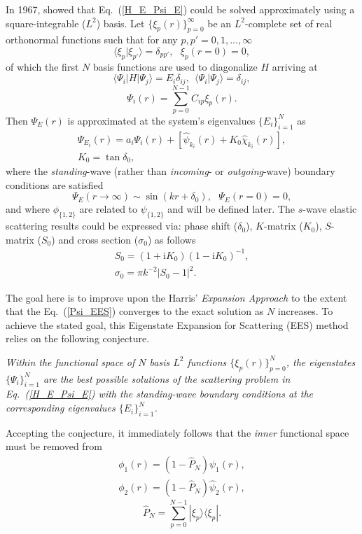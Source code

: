 \documentclass[aip
, pra
, showpacs
, aps
, twocolumn
, groupedaddress
, floatfix
]{revtex4}
\newcommand{\beq}{\begin{equation}}
\newcommand{\eeq}{\end{equation}}
\newcommand{\barr}{\begin{array}}
\newcommand{\earr}{\end{array}}
\begin{document}
In 1967, \citet{Harris67} showed that Eq.~(\ref{H_E_Psi_E}) could be solved
approximately using a square-integrable ($L^2$) basis.
Let $\{\xi_p(r)\}_{p=0}^\infty$ be an $L^2$-complete set of real orthonormal functions
such that for any $p,p'=0,1,...,\infty$
\beq
\langle \xi_p | \xi_{p'} \rangle=\delta_{pp'}, \ \ \ \xi_p(r=0)=0,
\eeq
of which the first $N$ basis functions are used to diagonalize $H$ arriving at
\beq
\langle \Psi_i |H| \Psi_j \rangle = E_i \delta_{ij} , \ \ \langle \Psi_i | \Psi_j \rangle=\delta_{ij},
\eeq
\beq
\Psi_i(r) = \sum_{p=0}^{N-1} C_{ip} \xi_p(r).
\eeq
Then $\Psi_E(r)$ is approximated at the system's eigenvalues $\{E_i\}_{i=1}^{N}$ as
\cite{Harris67}
\beq \barr{l}
\Psi_{E_i}(r) = a_i \Psi_i(r)  + [\hat{\psi}_{k_i}(r)  + K_0 \hat{\chi}_{k_i}(r)],\\
K_0 = \tan{\delta_0},
\earr \label{Psi_EES} \eeq
where the {\em standing}-wave (rather than {\em incoming}- or {\em outgoing}-wave) boundary conditions are satisfied
\beq
\Psi_E(r \rightarrow \infty) \sim \sin(kr+\delta_0), \ \ \ \Psi_E(r= 0)=0,
\eeq
and where $\phi_{\{1,2\}}$ are related to $\psi_{\{1,2\}}$ and will be defined later.
The $s$-wave elastic scattering results could be expressed via:
phase shift ($\delta_0$), $K$-matrix ($K_0$), $S$-matrix ($S_{0}$) and cross section ($\sigma_{0}$)
as follows
\beq \barr{l}
S_{0}=(1+\mbox{i}K_0)(1-\mbox{i}K_0)^{-1}, \\
\sigma_{0}=\pi k^{-2} |S_{0}-1|^2.
\earr \eeq


The goal here is to improve upon the Harris' {\em Expansion Approach} \cite{Harris67} to the extent that the Eq.~(\ref{Psi_EES})
converges to the exact solution as $N$ increases.
To achieve the stated goal, this Eigenstate Expansion for Scattering (EES) method relies on the following conjecture.


{\em Within the functional space of $N$ basis $L^2$ functions  $\{\xi_p(r)\}_{p=0}^N$,
the eigenstates $\{\Psi_i\}_{i=1}^{N}$ are the best possible solutions of the scattering problem in Eq.~(\ref{H_E_Psi_E})
with the standing-wave boundary conditions at the corresponding eigenvalues $\{E_i\}_{i=1}^{N}$.
}


Accepting the conjecture, it immediately follows that the {\em inner} functional space must be removed from
\beq \barr{l}
\phi_1(r) = (1-\hat{P}_N) \psi_1(r),\\
\phi_2(r) = (1-\hat{P}_N) \hat{\psi}_2(r),
\earr \eeq
\beq
\hat{P}_N = \sum_{p=0}^{N-1} | \xi_p \rangle \langle \xi_p |.
\eeq
\end{document}
